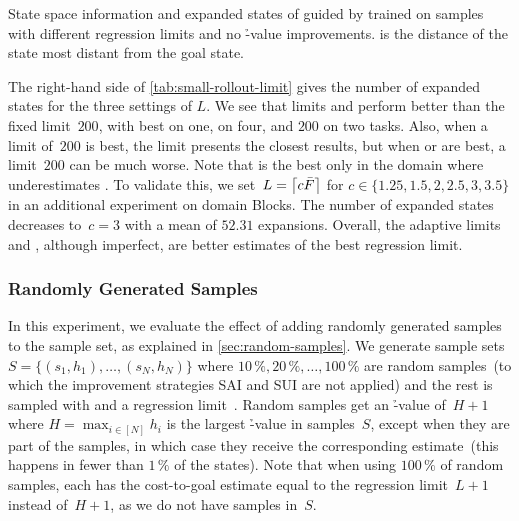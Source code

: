 \begin{table}[ht]
    \caption[State space information and expanded states with different regression limits.]{State space information and expanded states of \gbfs guided by \hnn trained on \bfsrw samples with different regression limits and no \h-value improvements. \ssdiameter is the distance of the state most distant from the goal state.}
    \label{tab:small-rollout-limit}
    \addmargin
    \centering
    
\end{table}

The right-hand side of \cref{tab:small-rollout-limit} gives the number of expanded states for the three settings of $L$. We see that limits \facts and \meanfx perform better than the fixed limit~$200$, with \facts best on one, \meanfx on four, and $200$ on two tasks. Also, when a limit of~$200$ is best, the limit \facts presents the closest results, but when \facts or \meanfx are best, a limit~$200$ can be much worse. Note that \facts is the best only in the domain where \meanfx underestimates \ssdiameter. To validate this, we set~$L=\left\lceil c\bar F\right\rceil$ for $c\in\{1.25,1.5,2,2.5,3,3.5\}$ in an additional experiment on domain Blocks. The number of expanded states decreases to~$c=3$ with a mean of $52.31$ expansions. Overall, the adaptive limits \facts and \meanfx, although imperfect, are better estimates of the best regression limit.

\subsubsection{Randomly Generated Samples}
\label{sec:small-exps-random-samples}

In this experiment, we evaluate the effect of adding randomly generated samples to the sample set, as explained in \cref{sec:random-samples}. We generate sample sets~$S=\{(s_1,h_1),\ldots,(s_N,h_N)\}$ where $10\,\%, 20\,\%,\ldots,100\,\%$ are random samples~(to which the improvement strategies SAI and SUI are not applied) and the rest is sampled with \bfsrw and a regression limit~\meanfx. Random samples get an \h-value of~$H+1$ where $H=\max_{i\in[N]} h_i$ is the largest \h-value in samples~$S$, except when they are part of the samples, in which case they receive the corresponding estimate~(this happens in fewer than $1\,\%$ of the states). Note that when using $100\,\%$ of random samples, each has the cost-to-goal estimate equal to the regression limit~$L+1$ instead of~$H+1$, as we do not have samples in~$S$.

